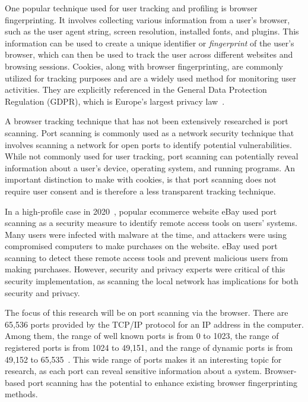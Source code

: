 One popular technique used for user tracking and profiling is browser fingerprinting. It involves collecting various information from a user's browser, such as the user agent string, screen resolution, installed fonts, and plugins. This information can be used to create a unique identifier or \emph{fingerprint} of the user's browser, which can then be used to track the user across different websites and browsing sessions. Cookies, along with browser fingerprinting, are commonly utilized for tracking purposes and are a widely used method for monitoring user activities. They are explicitly referenced in the General Data Protection Regulation (GDPR), which is Europe's largest privacy law~.

A browser tracking technique that has not been extensively researched is port scanning. Port scanning is commonly used as a network security technique that involves scanning a network for open ports to identify potential vulnerabilities. While not commonly used for user tracking, port scanning can potentially reveal information about a user's device, operating system, and running programs. An important distinction to make with cookies, is that port scanning does not require user consent and is therefore a less transparent tracking technique.

In a high-profile case in 2020~, popular ecommerce website eBay used port scanning as a security measure to identify remote access tools on users' systems. Many users were infected with malware at the time, and attackers were using compromised computers to make purchases on the website. eBay used port scanning to detect these remote access tools and prevent malicious users from making purchases. However, security and privacy experts were critical of this security implementation, as scanning the local network has implications for both security and privacy.

The focus of this research will be on port scanning via the browser. There are 65,536 ports provided by the TCP/IP protocol for an IP address in the computer. Among them, the range of well known ports is from 0 to 1023, the range of registered ports is from 1024 to 49,151, and the range of dynamic ports is from 49,152 to 65,535~.
This wide range of ports makes it an interesting topic for research, as each port can reveal sensitive information about a system. Browser-based port scanning has the potential to enhance existing browser fingerprinting methods.

